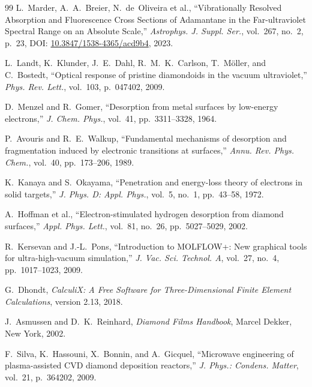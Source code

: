 \documentclass[10pt,twocolumn,a4paper]{article}
\begin{document}
\begin{thebibliography}{99}
L.~Marder, A.~A.~Breier, N.~de~Oliveira et al., ``Vibrationally Resolved Absorption and Fluorescence Cross Sections of Adamantane in the Far-ultraviolet Spectral Range on an Absolute Scale,'' \textit{Astrophys. J. Suppl. Ser.}, vol.~267, no.~2, p.~23, DOI: \href{https://doi.org/10.3847/1538-4365/acd9b4}{10.3847/1538-4365/acd9b4}, 2023.

L.~Landt, K.~Klunder, J.~E.~Dahl, R.~M.~K.~Carlson, T.~M\"oller, and C.~Bostedt, ``Optical response of pristine diamondoids in the vacuum ultraviolet,'' \textit{Phys. Rev. Lett.}, vol.~103, p.~047402, 2009.

D.~Menzel and R.~Gomer, ``Desorption from metal surfaces by low-energy electrons,'' \textit{J. Chem. Phys.}, vol.~41, pp.~3311--3328, 1964.

P.~Avouris and R.~E.~Walkup, ``Fundamental mechanisms of desorption and fragmentation induced by electronic transitions at surfaces,'' \textit{Annu. Rev. Phys. Chem.}, vol.~40, pp.~173--206, 1989.

K.~Kanaya and S.~Okayama, ``Penetration and energy-loss theory of electrons in solid targets,'' \textit{J. Phys. D: Appl. Phys.}, vol.~5, no.~1, pp.~43--58, 1972.

A.~Hoffman et al., ``Electron-stimulated hydrogen desorption from diamond surfaces,'' \textit{Appl. Phys. Lett.}, vol.~81, no.~26, pp.~5027--5029, 2002.

R.~Kersevan and J.-L.~Pons, ``Introduction to MOLFLOW+: New graphical tools for ultra-high-vacuum simulation,'' \textit{J. Vac. Sci. Technol. A}, vol.~27, no.~4, pp.~1017--1023, 2009.

G.~Dhondt, \textit{CalculiX: A Free Software for Three-Dimensional Finite Element Calculations}, version 2.13, 2018.

J.~Asmussen and D.~K.~Reinhard, \textit{Diamond Films Handbook}, Marcel Dekker, New York, 2002.

F.~Silva, K.~Hassouni, X.~Bonnin, and A.~Gicquel, ``Microwave engineering of plasma-assisted CVD diamond deposition reactors,'' \textit{J. Phys.: Condens. Matter}, vol.~21, p.~364202, 2009.

\end{thebibliography}
\end{document}
